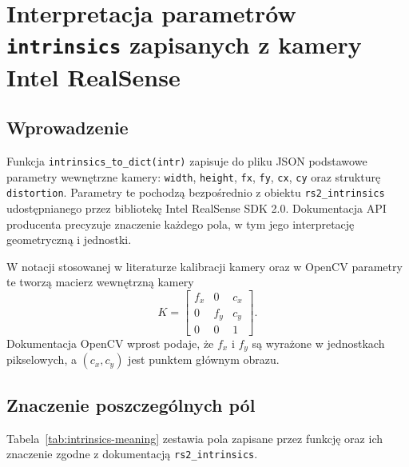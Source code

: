 \documentclass[12pt,a4paper]{report}
\begin{document}
\chapter{Interpretacja parametrów \texttt{intrinsics} zapisanych z kamery Intel RealSense}
\label{chap:intrinsics-realsense}

\section{Wprowadzenie}
Funkcja \texttt{intrinsics\_to\_dict(intr)} zapisuje do pliku JSON podstawowe parametry wewnętrzne kamery:
\texttt{width}, \texttt{height}, \texttt{fx}, \texttt{fy}, \texttt{cx}, \texttt{cy} oraz strukturę
\texttt{distortion}. Parametry te pochodzą bezpośrednio z obiektu \texttt{rs2\_intrinsics}
udostępnianego przez bibliotekę Intel RealSense SDK 2.0. Dokumentacja API producenta
precyzuje znaczenie każdego pola, w tym jego interpretację geometryczną i jednostki.

W notacji stosowanej w literaturze kalibracji kamery oraz w OpenCV parametry te tworzą
macierz wewnętrzną kamery
\begin{equation}
K =
\begin{bmatrix}
f_x & 0   & c_x \\
0   & f_y & c_y \\
0   & 0   & 1
\end{bmatrix}.
\end{equation}
Dokumentacja OpenCV wprost podaje, że $f_x$ i $f_y$ są wyrażone w jednostkach pikselowych,
a $(c_x, c_y)$ jest punktem głównym obrazu.

\section{Znaczenie poszczególnych pól}
Tabela~\ref{tab:intrinsics-meaning} zestawia pola zapisane przez funkcję oraz ich znaczenie
zgodne z dokumentacją \texttt{rs2\_intrinsics}.
\end{document}
